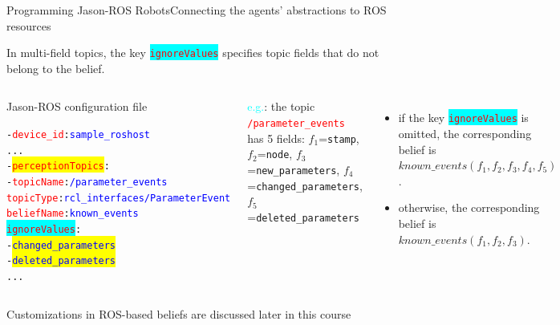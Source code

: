 \documentclass[compress]{beamer}
\newcommand{\yamlkey}[1]{\textcolor{red}{\texttt{#1}}}
\newcommand{\yamlvalue}[1]{\textcolor{blue}{\texttt{#1}}}
\begin{document}
\begin{frame}[fragile]{Programming Jason-ROS Robots}{Connecting the agents' abstractions to ROS resources}


\footnotesize
In multi-field topics, the key \colorbox{cyan}{\yamlkey{ignoreValues}} specifies topic fields that do not belong to the belief.

\vspace{.5cm}

\begin{columns}
 
\begin{block}{{\scriptsize Jason-ROS configuration file}}
  \begin{alltt}
- \yamlkey{device_id}: \yamlvalue{sample_roshost}    
     ...
  - \colorbox{yellow}{\yamlkey{perceptionTopics}}:     
    - \yamlkey{topicName}: \yamlvalue{/parameter_events}
      \yamlkey{topicType}: \yamlvalue{rcl_interfaces/ParameterEvent}
      \yamlkey{beliefName}: \yamlvalue{known_events} 
     \colorbox{cyan}{\yamlkey{ignoreValues}}:
        - \colorbox{yellow}{\yamlvalue{changed_parameters}}
        - \colorbox{yellow}{\yamlvalue{deleted_parameters}}
     ...
  \end{alltt}
\end{block}  

 \scriptsize
 \textcolor{cyan}{e.g.}: the topic \yamlkey{/parameter\_events} has 5 fields: {\tiny $f_1$=\texttt{stamp}, $f_2$=\texttt{node}, $f_3$=\texttt{new\_parameters}, $f_4$=\texttt{changed\_parameters}, $f_5$=\texttt{deleted\_parameters}}
 \begin{itemize}
  \item if the key \colorbox{cyan}{\yamlkey{ignoreValues}} is omitted, the corresponding belief is ${known\_events(f_1,f_2,f_3,f_4,f_5)}$.
  \item otherwise, the corresponding belief is ${known\_events(f_1,f_2,f_3)}$.
 \end{itemize}

 

 
 
 
\end{columns}


\vfill

{\tiny Customizations in ROS-based beliefs are discussed later in this course}

\end{frame}
\end{document}
